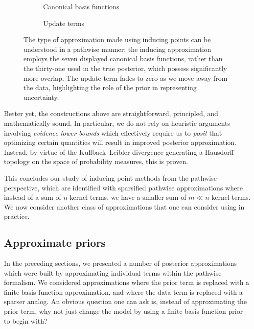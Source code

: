 \documentclass[11pt]{book}
\begin{document}
\begin{figure}
\begin{subfigure}{0.49\textwidth}

\caption{Canonical basis functions}
\end{subfigure}
\begin{subfigure}{0.49\textwidth}

\caption{Update terms}
\end{subfigure}
\caption{The type of approximation made using inducing points can be understood in a pathwise manner: the inducing approximation employs the seven displayed canonical basis functions, rather than the thirty-one used in the true posterior, which possess significantly more overlap.
The update term fades to zero as we move away from the data, highlighting the role of the prior in representing uncertainty.}
\label{fig:gp-inducing-basis}
\end{figure}

Better yet, the constructions above are straightforward, principled, and mathematically sound.
In particular, we do not rely on heuristic arguments involving \emph{evidence lower bounds} which effectively require us to \emph{posit} that optimizing certain quantities will result in improved posterior approximation.
Instead, by virtue of the Kullback--Leibler divergence generating a Hausdorff topology on the space of probability measures, this is proven.

This concludes our study of inducing point methods from the pathwise perspective, which are identified with sparsified pathwise approximations where instead of a sum of $n$ kernel terms, we have a smaller sum of $m \ll n$ kernel terms.
We now consider another class of approximations that one can consider using in practice.

\subsection{Approximate priors}
In the preceding sections, we presented a number of posterior approximations which were built by approximating individual terms within the pathwise formalism.
We considered approximations where the prior term is replaced with a finite basis function approximation, and where the data term is replaced with a sparser analog.
An obvious question one can ask is, instead of approximating the prior term, why not just change the model by using a finite basis function prior to begin with?
\end{document}

